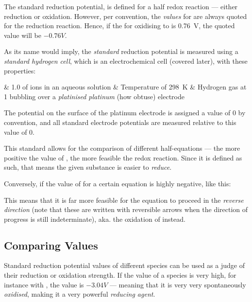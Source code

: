 		The standard reduction potential, \Eo{} is defined for a half redox reaction --- either reduction or oxidation. However, per
		convention, the \textit{values} for \Eo{} are always quoted for the reduction reaction. Hence, if the \Eo{} for oxidising
		 to  is \SI{+0.76}{\volt}, the quoted \Eo{} value will be $-0.76V$.

		As its name would imply, the \textit{standard} reduction potential is measured using a \textit{standard hydrogen cell}, which is
		an electrochemical cell (covered later), with these properties:

		\begin{bulletlist}
			& \SI{1.0}{\molarConc} of  ions in an aqueous solution
			& Temperature of \SI{298}{\kelvin}
			& Hydrogen gas at \SI{1}{\atm} bubbling over a \textit{platinised platinum} (how obtuse) electrode
		\end{bulletlist}

		The potential on the surface of the platinum electrode is assigned a value of $0$ by convention, and all standard electrode
		potentials are measured relative to this value of $0$.

		This standard allows for the comparison of different half-equations --- the more positive the value of \Eo{}, the more
		feasible the redox reaction. Since it is defined as such, that means the given substance is easier to \textit{reduce}.

		Conversely, if the value of \Eo{} for a certain equation is highly negative, like this:


		This means that it is far more feasible for the equation to proceed in the \textit{reverse direction} (note that these are
		written with reversible arrows when the direction of progress is still indeterminate), aka. the oxidation of  instead.


		\subsection{Comparing \MEo{} Values}

			Standard reduction potential values of different species can be used as a judge of their reduction or oxidation strength.
			If the \Eo{} value of a species is very high, for instance with , the \Eo{} value is $-3.04V$ --- meaning that it
			is very very spontaneously \textit{oxidised}, making it a very powerful \textit{reducing agent}.


